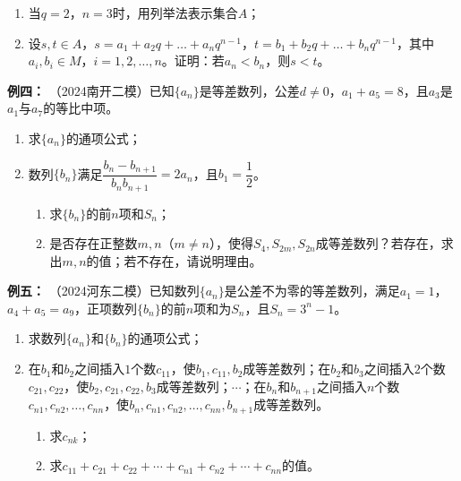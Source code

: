 \documentclass{article}
\begin{document}
\begin{enumerate}[label=(\Roman*)]
    \item 当$q = 2$，$n = 3$时，用列举法表示集合$A$；
    \item 设$s, t \in A$，$s = a_1 + a_2 q + \dots + a_n q^{n-1}$，$t = b_1 + b_2 q + \dots + b_n q^{n-1}$，其中$a_i, b_i \in M$，$i = 1, 2, \dots, n$。证明：若$a_n < b_n$，则$s < t$。
\end{enumerate}
\vspace{18\baselineskip}

\noindent \textbf{例四： }（2024南开二模）已知$\{a_n\}$是等差数列，公差$d \neq 0$，$a_1 + a_5 = 8$，且$a_3$是$a_1$与$a_7$的等比中项。

\begin{enumerate}[label=(\Roman*)]
    \item 求$\{a_n\}$的通项公式；
    \item 数列$\{b_n\}$满足$\dfrac{b_n - b_{n+1}}{b_n b_{n+1}} = 2a_n$，且$b_1 = \dfrac{1}{2}$。
    \begin{enumerate}[label=(\roman*)]
        \item 求$\{b_n\}$的前$n$项和$S_n$；
        \item 是否存在正整数$m, n$（$m \neq n$），使得$S_4, S_{2m}, S_{2n}$成等差数列？若存在，求出$m, n$的值；若不存在，请说明理由。
    \end{enumerate}
\end{enumerate}
\newpage

\noindent \textbf{例五： }（2024河东二模）已知数列$\{a_n\}$是公差不为零的等差数列，满足$a_1 = 1$，$a_4 + a_5 = a_9$，正项数列$\{b_n\}$的前$n$项和为$S_n$，且$S_n = 3^n - 1$。

\begin{enumerate}[label=(\Roman*)]
    \item 求数列$\{a_n\}$和$\{b_n\}$的通项公式；
    \item 在$b_1$和$b_2$之间插入$1$个数$c_{11}$，使$b_1, c_{11}, b_2$成等差数列；在$b_2$和$b_3$之间插入$2$个数$c_{21}, c_{22}$，使$b_2, c_{21}, c_{22}, b_3$成等差数列；$\cdots$；在$b_n$和$b_{n+1}$之间插入$n$个数$c_{n1}, c_{n2}, \dots, c_{nn}$，使$b_n, c_{n1}, c_{n2}, \dots, c_{nn}, b_{n+1}$成等差数列。
    \begin{enumerate}[label=(\roman*)]
        \item 求$c_{nk}$；
        \item 求$c_{11} + c_{21} + c_{22} + \cdots + c_{n1} + c_{n2} + \cdots + c_{nn}$的值。
    \end{enumerate}
\end{enumerate}
\vspace{18\baselineskip}
\end{document}
